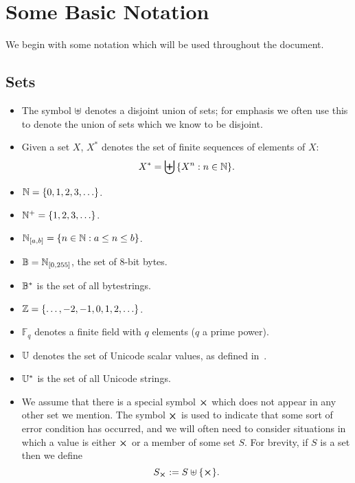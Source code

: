 \section{Some Basic Notation}
We begin with some notation which will be used throughout the document.

\subsection{Sets}
\label{sec:notation-sets}
\begin{itemize}
  \item The symbol $\uplus$ denotes a disjoint union of sets;  for emphasis we often use this
    to denote the union of sets which we know to be disjoint.
  \item Given a set $X$, $X^*$ denotes the set of finite sequences of elements of $X$:
    $$
    X^*= \biguplus{\{X^n: n \in \mathbb{N}\}}.
    $$
  \item $\mathbb{N} = \{0,1,2,3,\ldots\}$.
  \item $\mathbb{N}^{+} = \{1,2,3,\ldots\}$.
  \item $\mathbb{N}_{[a,b]} = \{n \in \mathbb{N}: a \leq n \leq b\}$.
  \item $\mathbb{B} = \mathbb{N}_{[0,255]}$, the set of 8-bit bytes.
  \item $\mathbb{B}^*$ is the set of all bytestrings.
  \item $\mathbb{Z} = \{\ldots, -2, -1, 0, 1, 2, \ldots\}$.
  \item $\mathbb{F}_q$ denotes a finite field with $q$ elements ($q$ a prime power).
  \item $\mathbb{U}$ denotes the set of Unicode scalar values, as defined in~\cite[Definition D76]{Unicode-standard}.
  \item $\mathbb{U}^*$ is the set of all Unicode strings.
  \item We assume that there is a special symbol $\errorX$ which does not appear
    in any other set we mention.  The symbol $\errorX$ is used to indicate that
    some sort of error condition has occurred, and we will often need to consider
    situations in which a value is either $\errorX$ or a member of some set $S$.
    For brevity, if $S$ is a set then we define
    $$
    \withError{S} := S \disj \{\errorX\}.
    $$
\end{itemize}%
%
%
%
%
%
%
%
%
%
%
%

